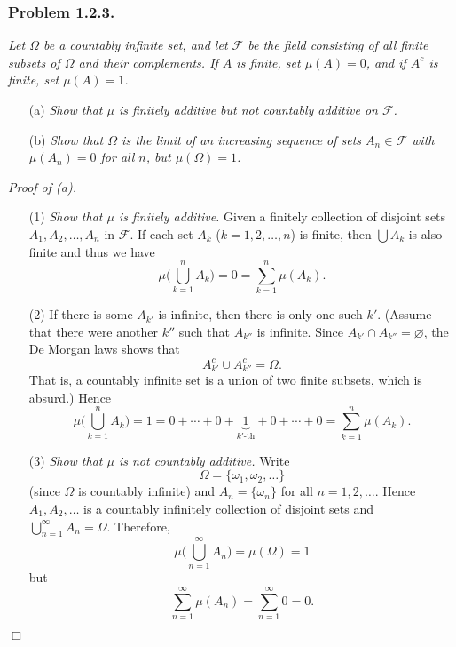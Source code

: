 \documentclass{article}
\begin{document}
\subsubsection*{Problem 1.2.3.}
\emph{Let $\Omega$ be a countably infinite set,
and let $\mathscr{F}$ be the field consisting of all finite subsets of $\Omega$
and their complements.
If $A$ is finite, set $\mu(A) = 0$, and if $A^{c}$ is finite, set $\mu(A) = 1$.}
\begin{enumerate}
\item[(a)]
  \emph{Show that $\mu$ is finitely additive but not countably additive on $\mathscr{F}$.}

\item[(b)]
  \emph{Show that $\Omega$ is the limit of an increasing sequence of sets $A_n \in \mathscr{F}$
  with $\mu(A_n) = 0$ for all $n$, but $\mu(\Omega) = 1$.} \\
\end{enumerate}



\emph{Proof of (a).}
\begin{enumerate}
\item[(1)]
  \emph{Show that $\mu$ is finitely additive.}
  Given a finitely collection of disjoint sets $A_1, A_2, \ldots, A_n$ in $\mathscr{F}$.
  If each set $A_k$ ($k = 1, 2, \ldots, n$) is finite,
  then $\bigcup A_k$ is also finite and thus we have
  \[
    \mu \Bigg( \bigcup_{k=1}^{n} A_k \Bigg)
    = 0
    = \sum_{k=1}^{n} \mu(A_k).
  \]

\item[(2)]
  If there is some $A_{k'}$ is infinite, then there is only one such $k'$.
  (Assume that there were another $k''$ such that $A_{k''}$ is infinite.
  Since $A_{k'} \cap A_{k''} = \varnothing$, the De Morgan laws shows that
  \[
    A_{k'}^{c} \cup A_{k''}^{c} = \Omega.
  \]
  That is, a countably infinite set is a union of two finite subsets, which is absurd.)
  Hence
  \[
    \mu \Bigg( \bigcup_{k=1}^{n} A_k \Bigg)
    = 1
    = 0 + \cdots + 0 + \underbrace{1}_{\text{$k'$-th}} + 0 + \cdots + 0
    = \sum_{k=1}^{n} \mu(A_k).
  \]

\item[(3)]
  \emph{Show that $\mu$ is not countably additive.}
  Write
  \[
    \Omega = \{ \omega_1, \omega_2, \ldots \}
  \]
  (since $\Omega$ is countably infinite) and
  $A_n = \{ \omega_n \}$ for all $n = 1, 2, \ldots$.
  Hence $A_1, A_2, \ldots$ is a countably infinitely collection of disjoint sets
  and $\bigcup_{n=1}^{\infty} A_n = \Omega$.
  Therefore,
  \[
    \mu \Bigg( \bigcup_{n=1}^{\infty} A_n \Bigg)
    = \mu(\Omega)
    = 1
  \]
  but
  \[
    \sum_{n=1}^{\infty} \mu(A_n)
    = \sum_{n=1}^{\infty} 0
    = 0.
  \]
\end{enumerate}
$\Box$ \\\\
\end{document}
